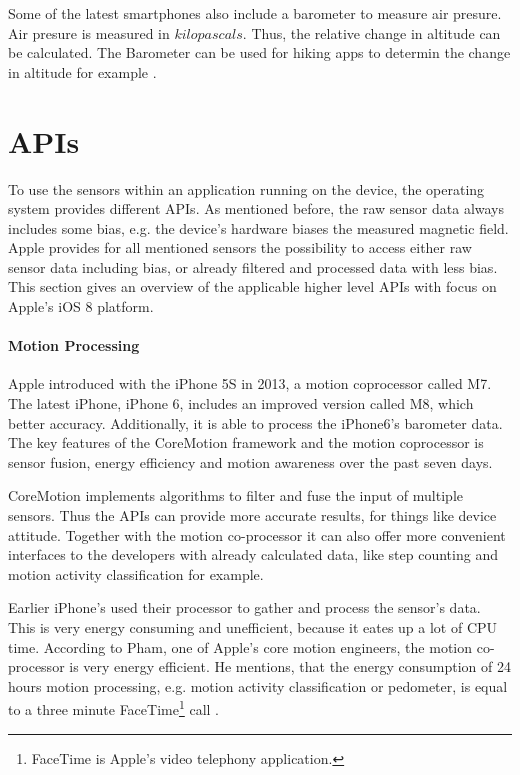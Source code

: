 Some of the latest smartphones also include a barometer to measure air presure.
Air presure is measured in $kilopascals$.
Thus, the relative change in altitude can be calculated.
The Barometer can be used for hiking apps to determin the change in altitude for example \cite{ios_cm}.


\section{\acsp{API}}

To use the sensors within an application running on the device, the operating system provides different \acsp{API}.
As mentioned before, the raw sensor data always includes some bias, e.g. the device's hardware biases the measured magnetic field.
Apple provides for all mentioned sensors the possibility to access either raw sensor data including bias, or already filtered and processed data with less bias.
This section gives an overview of the applicable higher level \acsp{API} with focus on Apple's iOS 8 platform.


\paragraph{Motion Processing}

Apple introduced with the iPhone 5S in 2013, a motion coprocessor called M7.
The latest iPhone, iPhone 6, includes an improved version called M8, which better accuracy. Additionally, it is able to process the iPhone6's barometer data.
The key features of the CoreMotion framework and the motion coprocessor is sensor fusion, energy efficiency and motion awareness over the past seven days.

CoreMotion implements algorithms to filter and fuse the input of multiple sensors.
Thus the \acsp{API} can provide more accurate results, for things like device attitude.
Together with the motion co-processor it can also offer more convenient interfaces to the developers with already calculated data, like step counting and motion activity classification for example.

Earlier iPhone's used their processor to gather and process the sensor's data.
This is very energy consuming and unefficient, because it eates up a lot of \acs{CPU} time.
According to Pham, one of Apple's core motion engineers, the motion co-processor is very energy efficient.
He mentions, that the energy consumption of 24 hours motion processing, e.g. motion activity classification or pedometer, is equal to a three minute FaceTime\footnote{FaceTime is Apple's video telephony application.} call \cite{wwdc_2014}.

